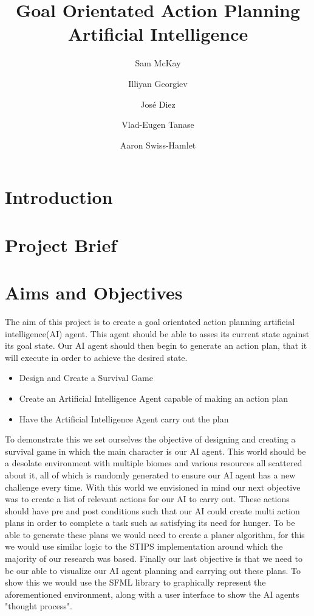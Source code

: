 \documentclass{report}
\begin{document}
\title{Goal Orientated Action Planning Artificial Intelligence}
\author{Sam McKay \and Illiyan Georgiev \and ‎José Diez\and Vlad-Eugen Tanase \and Aaron Swiss-Hamlet }
\maketitle
\tableofcontents
\chapter{Introduction}
\chapter{Project Brief}
\chapter{Aims and Objectives}
The aim of this project is to create a goal orientated action planning artificial intelligence(AI) agent. This agent should be able to asses its current state against its goal state. Our AI agent should then begin to generate an action plan, that it will execute in order to achieve the desired state. \newline

\begin{itemize}
	\item Design and Create a Survival Game
	\item Create an Artificial Intelligence Agent capable of making an action plan
	\item Have the Artificial Intelligence Agent carry out the plan 
\end{itemize}

To demonstrate this we set ourselves the objective of designing and creating a survival game in which the main character is our AI agent. This world should be a desolate environment with multiple biomes and various resources all scattered about it, all of which is randomly generated to ensure our AI agent has a new challenge every time. With this world we envisioned in mind our next objective was to create a list of relevant actions for our AI to carry out. These actions should have pre and post conditions such that our AI could create multi action plans in order to complete a task such as satisfying its need for hunger. To be able to generate these plans we would need to create a planer algorithm, for this we would use similar logic to the STIPS implementation around which the majority of our research was based. Finally our last objective is that we need to be our able to visualize our AI agent planning and carrying out these plans. To show this we would use the SFML library to graphically represent the aforementioned environment, along with a user interface to show the AI agents "thought process".
 
\end{document}
